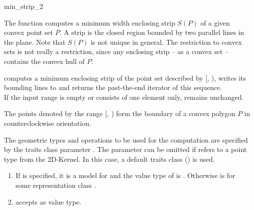 \begin{ccRefFunction}{min_strip_2}
  
  \ccDefinition The function computes a minimum width enclosing strip
  $S(P)$ of a given convex point set $P$. A strip is the closed region
  bounded by two parallel lines in the plane. Note that $S(P)$ is not
  unique in general.  The restriction to convex sets is not really a
  restriction, since any enclosing strip -- as a convex set --
  contains the convex hull of $P$.


  \def\ccLongParamLayout{\ccTrue} 
  
  
  computes a minimum enclosing strip of the point set described by
  [, ), writes its bounding lines to
   and returns the past-the-end iterator of this sequence.\\
  If the input range is empty or consists of one element only, 
  remains unchanged.
  
  \ccPrecond The points denoted by the range [,
  ) form the boundary of a convex polygon $P$ in
  counterclockwise orientation.

  The geometric types and operations to be used for the computation
  are specified by the traits class parameter . The parameter
  can be omitted if  refers to a point type from
  the 2D-Kernel. In this case, a default traits class
  () is used.
  
  \ccRequire
  \begin{enumerate}
  \item If  is specified, it is a model for
     and the value type  of
     is .  Otherwise
     is  for some representation class
    .
  \item {} accepts  as value type.
  \end{enumerate}
  

\end{ccRefFunction}
